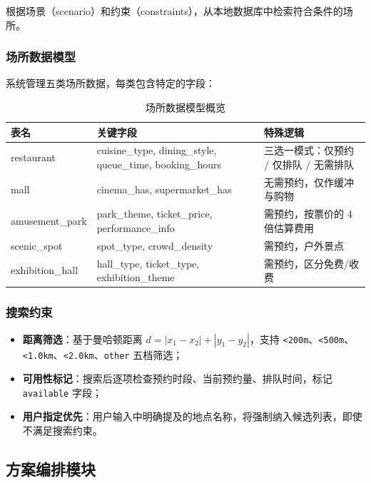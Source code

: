 \documentclass[12pt,a4paper]{ctexart}
\begin{document}
根据场景（scenario）和约束（constraints），从本地数据库中检索符合条件的场所。

\subsubsection{场所数据模型}

系统管理五类场所数据，每类包含特定的字段：

\begin{table}[ht]
\centering
\small
\begin{tabular}{p{2.5cm}p{4cm}p{6cm}}
\toprule
\textbf{表名} & \textbf{关键字段} & \textbf{特殊逻辑} \\
\midrule
restaurant    & cuisine\_type, dining\_style, queue\_time, booking\_hours & 三选一模式：仅预约 / 仅排队 / 无需排队 \\
mall          & cinema\_has, supermarket\_has & 无需预约，仅作缓冲与购物 \\
amusement\_park & park\_theme, ticket\_price, performance\_info & 需预约，按票价的 4 倍估算费用 \\
scenic\_spot  & spot\_type, crowd\_density & 需预约，户外景点 \\
exhibition\_hall & hall\_type, ticket\_type, exhibition\_theme & 需预约，区分免费/收费 \\
\bottomrule
\end{tabular}
\caption{场所数据模型概览}
\label{tab:venue-models}
\end{table}

\subsubsection{搜索约束}

\begin{itemize}
  \item \textbf{距离筛选}：基于曼哈顿距离 $d = |x_1 - x_2| + |y_1 - y_2|$，支持 \texttt{<200m}、\texttt{<500m}、\texttt{<1.0km}、\texttt{<2.0km}、\texttt{other} 五档筛选；
  \item \textbf{可用性标记}：搜索后逐项检查预约时段、当前预约量、排队时间，标记 \texttt{available} 字段；
  \item \textbf{用户指定优先}：用户输入中明确提及的地点名称，将强制纳入候选列表，即使不满足搜索约束。
\end{itemize}

\subsection{方案编排模块}
\end{document}
